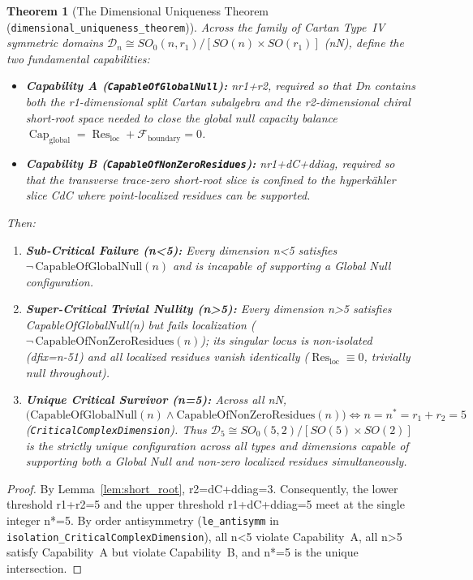 \documentclass[11pt,reqno]{amsart}
\newtheorem{theorem}{Theorem}[section]
\theoremstyle{definition}
\theoremstyle{remark}
\newcommand{\CapGlobal}{\operatorname{Cap}_{\mathrm{global}}}
\newcommand{\ResLoc}{\operatorname{Res}_{\mathrm{loc}}}
\newcommand{\FluxBdy}{\mathcal{F}_{\mathrm{boundary}}}
\begin{document}
\begin{theorem}[The Dimensional Uniqueness Theorem (\texttt{dimensional\_uniqueness\_theorem})]
\label{thm:dimensional_uniqueness}
Across the family of Cartan Type~IV symmetric domains $\mathcal{D}_n \cong SO_0(n, r_1)/[SO(n)\times SO(r_1)]$ (nN), define the two fundamental capabilities:
\begin{itemize}
  \item \textbf{Capability A (\texttt{CapableOfGlobalNull}):} nr1+r2, required so that Dn contains both the r1-dimensional split Cartan subalgebra and the r2-dimensional chiral short-root space needed to close the global null capacity balance $\CapGlobal = \ResLoc + \FluxBdy = 0$.
  \item \textbf{Capability B (\texttt{CapableOfNonZeroResidues}):} nr1+dC+ddiag, required so that the transverse trace-zero short-root slice is confined to the hyperk\"ahler slice CdC where point-localized residues can be supported.
\end{itemize}
Then:
\begin{enumerate}[label=(\arabic*)]
  \item \textbf{Sub-Critical Failure (n<5):} Every dimension n<5 satisfies $\neg\,\mathrm{CapableOfGlobalNull}(n)$ and is incapable of supporting a Global Null configuration.
  \item \textbf{Super-Critical Trivial Nullity (n>5):} Every dimension n>5 satisfies CapableOfGlobalNull(n) but fails localization ($\neg\,\mathrm{CapableOfNonZeroResidues}(n)$); its singular locus is non-isolated (dfix=n-51) and all localized residues vanish identically ($\ResLoc \equiv 0$, trivially null throughout).
  \item \textbf{Unique Critical Survivor (n=5):} Across all nN,
  \begin{equation}
    \bigl(\mathrm{CapableOfGlobalNull}(n) \wedge \mathrm{CapableOfNonZeroResidues}(n)\bigr) \iff n = n^* = r_1 + r_2 = 5
  \end{equation}
  (\texttt{CriticalComplexDimension}). Thus $\mathcal{D}_5 \cong SO_0(5,2)/[SO(5)\times SO(2)]$ is the strictly unique configuration across all types and dimensions capable of supporting both a Global Null and non-zero localized residues simultaneously.
\end{enumerate}
\end{theorem}
\begin{proof}
By Lemma~\ref{lem:short_root}, r2=dC+ddiag=3. Consequently, the lower threshold r1+r2=5 and the upper threshold r1+dC+ddiag=5 meet at the single integer n*=5. By order antisymmetry (\texttt{le\_antisymm} in \texttt{isolation\_CriticalComplexDimension}), all n<5 violate Capability~A, all n>5 satisfy Capability~A but violate Capability~B, and n*=5 is the unique intersection.
\end{proof}
\end{document}
